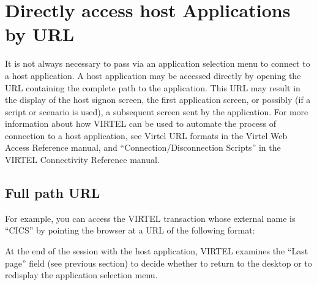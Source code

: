 \documentclass[letterpaper,10pt,english]{sphinxmanual}
\begin{document}
\section{Directly access host Applications by URL}
\label{\detokenize{Customization:directly-access-host-applications-by-url}}
\ignorespaces 
It is not always necessary to pass via an application selection menu to connect to a host application. A host application may be accessed directly by opening the URL containing the complete path to the application. This URL may result in the display of the host signon screen, the first application screen, or possibly (if a script or scenario is used), a
subsequent screen sent by the application. For more information about how VIRTEL can be used to automate the process of connection to a host application, see Virtel URL formats in the Virtel Web Access Reference manual, and “Connection/Disconnection Scripts” in the VIRTEL Connectivity Reference manual.


\subsection{Full path URL}
\label{\detokenize{Customization:full-path-url}}
For example, you can access the VIRTEL transaction whose external name is “CICS” by pointing the browser at a URL of the following format:

\begin{sphinxVerbatim}[commandchars=\\\{\}]
\end{sphinxVerbatim}

At the end of the session with the host application, VIRTEL examines the “Last page” field (see previous section) to decide whether to return to the desktop or to redisplay the application selection menu.

\ignorespaces 
\end{document}
